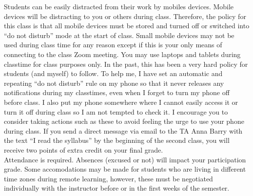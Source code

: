\documentclass[10pt]{article}
\begin{document}
Students can be easily distracted from their work by mobiles devices. Mobile devices will be distracting to you or others during class. Therefore, the policy for this class is that all mobile devices must be stored and turned off or switched into ``do not disturb'' mode at the start of class. Small mobile devices may not be used during class time for any reason except if this is your only means of connecting to the class Zoom meeting. 
You may use laptops and tablets during classtime for class purposes only. In the past, this has been a very hard policy for students (and myself) to follow. To help me, I have set an automatic and repeating ``do not disturb'' rule on my phone so that it never releases any notifications during my classtimes, even when I forget to turn my phone off before class. I also put my phone somewhere where I cannot easily access it or turn it off during class so I am not tempted to check it. I encourage you to consider taking actions such as these to avoid feeling the urge to use your phone during class. %
If you send a direct message via email to the TA Anna Barry with the text ``I read the syllabus'' by the beginning of the second class, you will receive two points of extra credit on your final grade. \\


 Attendance is required. Absences (excused or not) will impact your participation grade. Some accomodations may be made for students who are living in different time zones during remote learning, however, these must be negotiated individually with the instructor before or in the first weeks of the semester.\\
\end{document}
